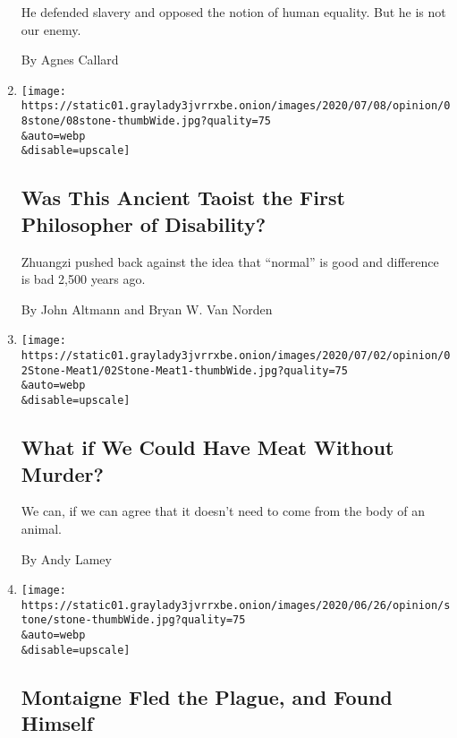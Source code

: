 \begin{enumerate}
  He defended slavery and opposed the notion of human equality. But he
  is not our enemy.

  By Agnes Callard
\item
  \href{/2020/07/08/opinion/disability-philosophy-zhuangzi.html}{}

  \texttt{[image: https://static01.graylady3jvrrxbe.onion/images/2020/07/08/opinion/08stone/08stone-thumbWide.jpg?quality=75\\\&auto=webp\\\&disable=upscale]}

  \hypertarget{was-this-ancient-taoist-the-first-philosopher-of-disability}{%
  \subsection{Was This Ancient Taoist the First Philosopher of
  Disability?}\label{was-this-ancient-taoist-the-first-philosopher-of-disability}}

  Zhuangzi pushed back against the idea that ``normal'' is good and
  difference is bad 2,500 years ago.

  By John Altmann and Bryan W. Van Norden
\item
  \href{/2020/07/02/opinion/lab-grown-meat.html}{}

  \texttt{[image: https://static01.graylady3jvrrxbe.onion/images/2020/07/02/opinion/02Stone-Meat1/02Stone-Meat1-thumbWide.jpg?quality=75\\\&auto=webp\\\&disable=upscale]}

  \hypertarget{what-if-we-could-have-meat-without-murder}{%
  \subsection{What if We Could Have Meat Without
  Murder?}\label{what-if-we-could-have-meat-without-murder}}

  We can, if we can agree that it doesn't need to come from the body of
  an animal.

  By Andy Lamey
\item
  \href{/2020/06/28/opinion/montaigne-plague-essays.html}{}

  \texttt{[image: https://static01.graylady3jvrrxbe.onion/images/2020/06/26/opinion/stone/stone-thumbWide.jpg?quality=75\\\&auto=webp\\\&disable=upscale]}

  \hypertarget{montaigne-fled-the-plague-and-found-himself}{%
  \subsection{Montaigne Fled the Plague, and Found
  Himself}\label{montaigne-fled-the-plague-and-found-himself}}


\end{enumerate}
